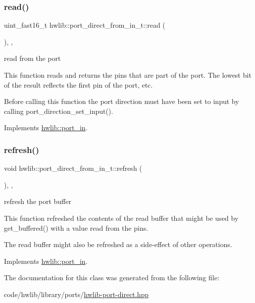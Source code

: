 \subsubsection{\texorpdfstring{read()}{read()}}
{\footnotesize\ttfamily uint\+\_\+fast16\+\_\+t hwlib\+::port\+\_\+direct\+\_\+from\+\_\+in\+\_\+t\+::read (\begin{DoxyParamCaption}{ }\end{DoxyParamCaption})\hspace{0.3cm}{\ttfamily [inline]}, {\ttfamily [override]}, {\ttfamily [virtual]}}





read from the port

This function reads and returns the pins that are part of the port. The lowest bit of the result reflects the first pin of the port, etc.

Before calling this function the port direction must have been set to input by calling port\+\_\+direction\+\_\+set\+\_\+input(). 

Implements \hyperlink{classhwlib_1_1port__in_aa3aa277f9448c3ee493c56f05beb2ddb}{hwlib\+::port\+\_\+in}.

\mbox{\label{classhwlib_1_1port__direct__from__in__t_ab6b6bdd7d83f3ef606960950e4c281c0}} 
\subsubsection{\texorpdfstring{refresh()}{refresh()}}
{\footnotesize\ttfamily void hwlib\+::port\+\_\+direct\+\_\+from\+\_\+in\+\_\+t\+::refresh (\begin{DoxyParamCaption}{ }\end{DoxyParamCaption})\hspace{0.3cm}{\ttfamily [inline]}, {\ttfamily [override]}, {\ttfamily [virtual]}}





refresh the port buffer

This function refreshed the contents of the read buffer that might be used by get\+\_\+buffered() with a value read from the pins.

The read buffer might also be refreshed as a side-\/effect of other operations. 

Implements \hyperlink{classhwlib_1_1port__in_a5d409eee35b766c844f7229fbe010545}{hwlib\+::port\+\_\+in}.



The documentation for this class was generated from the following file\+:\begin{DoxyCompactItemize}
\item 
code/hwlib/library/ports/\hyperlink{hwlib-port-direct_8hpp}{hwlib-\/port-\/direct.\+hpp}\end{DoxyCompactItemize}
